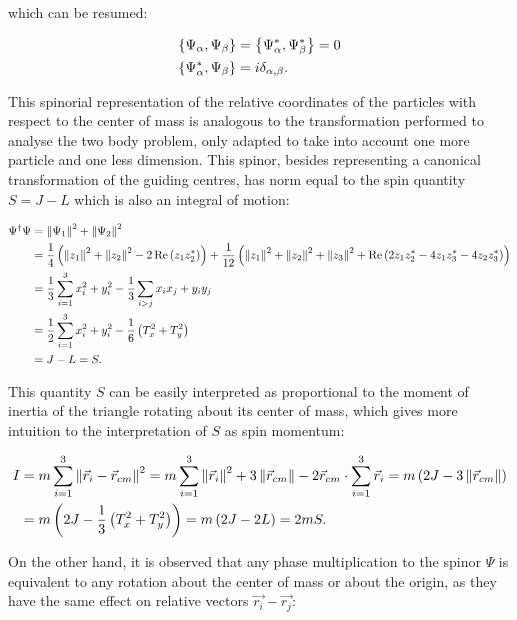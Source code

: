 which can be resumed:

\begin{align}
\left\lbrace \Psi_\alpha, \Psi_\beta \right\rbrace &= \left\lbrace \Psi_\alpha^*, \Psi_\beta^* \right\rbrace = 0\\
\left\lbrace \Psi_\alpha^*, \Psi_\beta \right\rbrace &= i\delta_{\alpha,\beta}.
\label{eq:canonicalSpinor}
\end{align}

This spinorial representation of the relative coordinates of the particles with respect to the center of mass is analogous to the transformation performed to analyse the two body problem, only adapted to take into account one more particle and one less dimension. This spinor, besides representing a canonical transformation of the guiding centres, has norm equal to the spin quantity $S = J-L$ which is also an integral of motion:

\small
\begin{align*}
\Psi^\dagger\Psi &= \left\lVert \Psi_1 \right\rVert^2 + \left\lVert \Psi_2 \right\rVert^2 \\
&= \frac{1}{4}\left( \left\lVert z_1 \right\rVert^2 + \left\lVert z_2 \right\rVert^2 - 2\operatorname{Re}\left( z_1z_2^* \right) \right) + \frac{1}{12}\left( \left\lVert z_1 \right\rVert^2 + \left\lVert z_2 \right\rVert^2+ \left\lVert z_3 \right\rVert^2 + \operatorname{Re}\left( 2z_1z_2^*- 4z_1z_3^*- 4z_2z_3^* \right) \right)\\
&= \frac{1}{3}\sum_{i=1}^3 x_i^2 + y_i^2 -\frac{1}{3}\sum_{i > j} x_ix_j + y_iy_j\\
&= \frac{1}{2}\sum_{i=1}^3 x_i^2 + y_i^2 - \frac{1}{6}\left( T_x^2+T_y^2 \right)\\
&= J-L = S.
\end{align*}
\normalsize

This quantity $S$ can be easily interpreted as proportional to the moment of inertia of the triangle rotating about its center of mass, which gives more intuition to the interpretation of $S$ as spin momentum:

\begin{align*}
I &= m\sum_{i=1}^3 \left\lVert \vec{r}_i - \vec{r}_{cm} \right\rVert^2 = m\sum_{i=1}^3 \left\lVert \vec{r}_i \right\rVert^2 + 3\left\lVert \vec{r}_{cm} \right\rVert - 2\vec{r}_{cm}\cdot\sum_{i=1}^3\vec{r}_i =m\left( 2J -3\left\lVert \vec{r}_{cm} \right\rVert \right)\\
&= m\left( 2J - \frac{1}{3}\left( T_x^2+T_y^2 \right) \right) = m\left( 2J-2L \right) = 2mS.
\end{align*}

On the other hand, it is observed that any phase multiplication to the spinor $\Psi$ is equivalent to any rotation about the center of mass or about the origin, as they have the same effect on relative vectors $\vec{r_i}-\vec{r_j}$:

